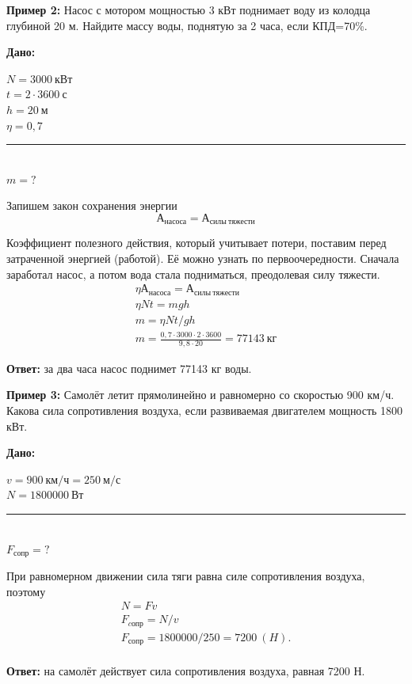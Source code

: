 \documentclass[a6paper, 11pt]{diss_4}
\renewcommand{\'}{\,'}
\begin{document}
\textbf{Пример 2:}  Насос с мотором мощностью 3 кВт поднимает воду из колодца глубиной 20 м.
Найдите массу воды, поднятую за 2 часа, если КПД=70\%.

\hspace{1cm}\textbf{Дано:}\hspace{.3cm}
\parbox[t]{4cm}{
$N= 3000\ кВт$\\
$t= 2\cdot3600\ с$\\
$h= 20\ м$\\
$\eta=0,7$\\
\rule{4cm}{.4pt}\\
$m= ?$\\
}

Запишем закон сохранения энергии
\[
А_{насоса}=А_{силы\ тяжести}
\]

Коэффициент полезного действия, который учитывает потери, поставим перед затраченной энергией (работой). Её можно узнать по первоочередности. Сначала заработал насос, а потом вода стала подниматься, преодолевая силу тяжести.
\begin{gather*}
\eta А_{насоса}=А_{силы\ тяжести}\\
\eta Nt=mgh\\
m=\eta Nt/gh\\
m=\frac{0,7\cdot3000\cdot2\cdot3600}{9,8\cdot20}=77143\ кг
\end{gather*}

\textbf{Ответ:} за два часа насос поднимет 77143 кг воды.

\textbf{Пример 3:}  Самолёт летит прямолинейно и равномерно со скоростью 900 км/ч. Какова сила сопротивления воздуха, если развиваемая двигателем мощность 1800 кВт.

\hspace{1cm}\textbf{Дано:}\hspace{.3cm}
\parbox[t]{4.5cm}{
$v= 900\ км/ч=250\ м/с$\\
$N= 1800000\ Вт$\\
\rule{4cm}{.4pt}\\
$F_{сопр}= ?$\\
}

При равномерном движении сила тяги равна силе сопротивления воздуха, поэтому
\begin{gather*}
N=Fv\\
F_{cопр}=N/v\\
F_{сопр}=1800000/250=7200\ (H).\\
\end{gather*}

\textbf{Ответ:} на самолёт действует сила сопротивления воздуха, равная 7200 Н.
\end{document}
